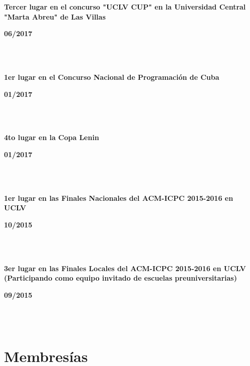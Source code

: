 \documentclass{article}
\begin{document}
\begin{minipage}{0.8\textwidth}
\parbox{0.8\linewidth}{\textbf{Tercer lugar en el concurso "UCLV CUP" en la Universidad Central "Marta Abreu" de Las Villas}} \hfill \textbf{06/2017}\\
\\
\end{minipage}\\
\begin{minipage}{0.8\textwidth}
\parbox{0.8\linewidth}{\textbf{1er lugar en el Concurso Nacional de Programación de Cuba}} \hfill \textbf{01/2017}\\
\\
\end{minipage}\\
\begin{minipage}{0.8\textwidth}
\parbox{0.8\linewidth}{\textbf{4to lugar en la Copa Lenin}} \hfill \textbf{01/2017}\\
\\
\end{minipage}\\
\begin{minipage}{0.8\textwidth}
\parbox{0.8\linewidth}{\textbf{1er lugar en las Finales Nacionales del ACM-ICPC 2015-2016 en UCLV }} \hfill \textbf{10/2015}\\
\\
\end{minipage} \\
\begin{minipage}{0.8\textwidth}
\parbox{0.8\linewidth}{\textbf{3er lugar en las Finales Locales del ACM-ICPC 2015-2016 en UCLV (Participando como equipo invitado de escuelas preuniversitarias)}} \hfill \textbf{09/2015}\\
\\
\end{minipage}\\

\section*{Membresías}
\end{document}
